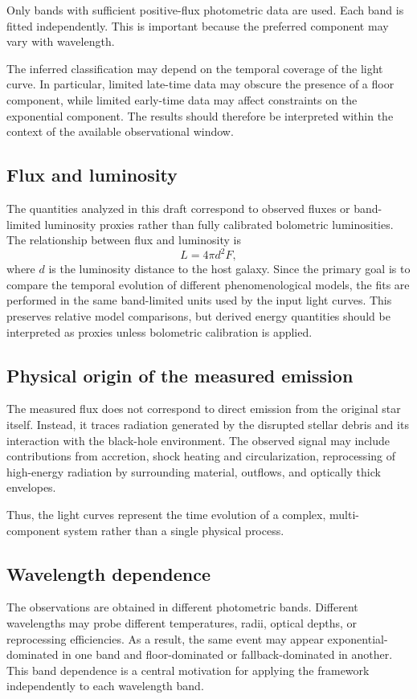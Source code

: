 \documentclass[11pt]{article}
\begin{document}
Only bands with sufficient positive-flux photometric data are used. Each band is fitted independently. This is important because the preferred component may vary with wavelength.

The inferred classification may depend on the temporal coverage of the light curve. In particular, limited late-time data may obscure the presence of a floor component, while limited early-time data may affect constraints on the exponential component. The results should therefore be interpreted within the context of the available observational window.


\subsection{Flux and luminosity}
The quantities analyzed in this draft correspond to observed fluxes or band-limited luminosity proxies rather than fully calibrated bolometric luminosities. The relationship between flux and luminosity is
\begin{equation}
L = 4\pi d^2 F,
\end{equation}
where $d$ is the luminosity distance to the host galaxy. Since the primary goal is to compare the temporal evolution of different phenomenological models, the fits are performed in the same band-limited units used by the input light curves. This preserves relative model comparisons, but derived energy quantities should be interpreted as proxies unless bolometric calibration is applied.

\subsection{Physical origin of the measured emission}
The measured flux does not correspond to direct emission from the original star itself. Instead, it traces radiation generated by the disrupted stellar debris and its interaction with the black-hole environment. The observed signal may include contributions from accretion, shock heating and circularization, reprocessing of high-energy radiation by surrounding material, outflows, and optically thick envelopes.

Thus, the light curves represent the time evolution of a complex, multi-component system rather than a single physical process.

\subsection{Wavelength dependence}
The observations are obtained in different photometric bands. Different wavelengths may probe different temperatures, radii, optical depths, or reprocessing efficiencies. As a result, the same event may appear exponential-dominated in one band and floor-dominated or fallback-dominated in another. This band dependence is a central motivation for applying the framework independently to each wavelength band.
\end{document}
